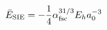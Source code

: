 \documentclass[preview]{standalone}
\begin{document}
\begin{align*}
\special{dvisvgm:raw <g id='unique000'>}\bar{E}_{\mathrm{SIE}}=-\frac{1}{4}\alpha_{\mathrm{fsc}}^{31/3}E_h a_0^{-3}\special{dvisvgm:raw </g>}
\end{align*}
\end{document}
